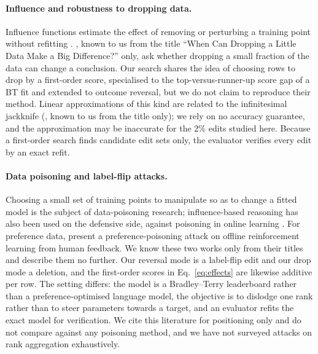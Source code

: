 \documentclass{article}
\begin{document}
\paragraph{Influence and robustness to dropping data.}
Influence functions estimate the effect of removing or perturbing a training point without refitting \citep{Koh2017Understanding}. \citet{Broderick2020Automatic}, known to us from the title ``When Can Dropping a Little Data Make a Big Difference?'' only, ask whether dropping a small fraction of the data can change a conclusion. Our search shares the idea of choosing rows to drop by a first-order score, specialised to the top-versus-runner-up score gap of a BT fit and extended to outcome reversal, but we do not claim to reproduce their method. Linear approximations of this kind are related to the infinitesimal jackknife (\citealp{Giordano2018Swiss}, known to us from the title only); we rely on no accuracy guarantee, and the approximation may be inaccurate for the 2\% edits studied here. Because a first-order search finds candidate edit sets only, the evaluator verifies every edit by an exact refit.

\paragraph{Data poisoning and label-flip attacks.}
Choosing a small set of training points to manipulate so as to change a fitted model is the subject of data-poisoning research; influence-based reasoning has also been used on the defensive side, against poisoning in online learning \citep{Seetharaman2021Influence}. For preference data, \citet{Yang2026Preference} present a preference-poisoning attack on offline reinforcement learning from human feedback. We know these two works only from their titles and describe them no further. Our reversal mode is a label-flip edit and our drop mode a deletion, and the first-order scores in Eq.~\eqref{eq:effects} are likewise additive per row. The setting differs: the model is a Bradley--Terry leaderboard rather than a preference-optimised language model, the objective is to dislodge one rank rather than to steer parameters towards a target, and an evaluator refits the exact model for verification. We cite this literature for positioning only and do not compare against any poisoning method, and we have not surveyed attacks on rank aggregation exhaustively.
\end{document}
